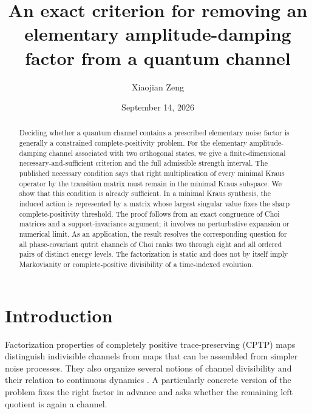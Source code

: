 \documentclass[aip,jmp,preprint]{revtex4-2}
\begin{document}
\title{An exact criterion for removing an elementary amplitude-damping factor from a quantum channel}

\author{Xiaojian Zeng}

\date{September 14, 2026}

\begin{abstract}
Deciding whether a quantum channel contains a prescribed elementary noise factor is generally a constrained complete-positivity problem.  For the elementary amplitude-damping channel associated with two orthogonal states, we give a finite-dimensional necessary-and-sufficient criterion and the full admissible strength interval.  The published necessary condition says that right multiplication of every minimal Kraus operator by the transition matrix must remain in the minimal Kraus subspace.  We show that this condition is already sufficient.  In a minimal Kraus synthesis, the induced action is represented by a matrix whose largest singular value fixes the sharp complete-positivity threshold.  The proof follows from an exact congruence of Choi matrices and a support-invariance argument; it involves no perturbative expansion or numerical limit.  As an application, the result resolves the corresponding question for all phase-covariant qutrit channels of Choi ranks two through eight and all ordered pairs of distinct energy levels.  The factorization is static and does not by itself imply Markovianity or complete-positive divisibility of a time-indexed evolution.
\end{abstract}

\maketitle

\section{Introduction}

Factorization properties of completely positive trace-preserving (CPTP) maps distinguish indivisible channels from maps that can be assembled from simpler noise processes.  They also organize several notions of channel divisibility and their relation to continuous dynamics \cite{WolfCirac2008,DavalosZiman2023}.  A particularly concrete version of the problem fixes the right factor in advance and asks whether the remaining left quotient is again a channel.
\end{document}
